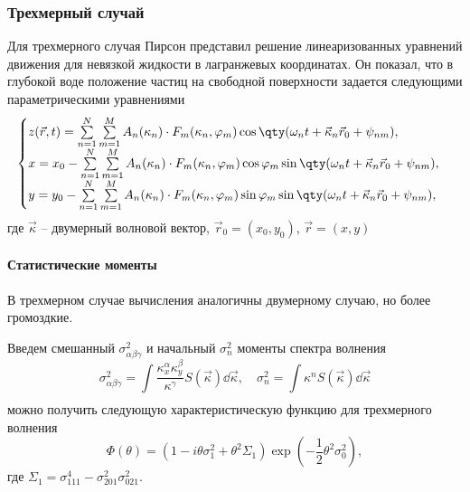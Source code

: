 \subsubsection{Трехмерный случай}%

Для трехмерного случая Пирсон \cite{pierson} представил решение
линеаризованных уравнений движения для невязкой жидкости в лагранжевых
координатах. Он показал, что в глубокой воде положение частиц на свободной поверхности задается следующими параметрическими уравнениями
\begin{equation}
    \begin{cases}
        \label{eq:surface2dcwm}
        z(\vec r,t) = \sum\limits_{n=1}^{N} \sum\limits_{m=1}^{M}
        A_n(\kappa_n) \cdot
        F_m(\kappa_n,\phi_m) \cos \qty(\omega_n t + \vec \kappa_n \vec r_0 +
        \psi_{nm}),    \\
        x = x_0 - \sum\limits_{n=1}^{N} \sum\limits_{m=1}^{M}
        A_n(\kappa_n) \cdot
        F_m(\kappa_n,\phi_m) \cos\phi_m \sin\qty(\omega_n t + \vec \kappa_n \vec r_0 +
        \psi_{nm}),\\
        y = y_{0} - \sum\limits_{n=1}^{N} \sum\limits_{m=1}^{M}
        A_n(\kappa_n) \cdot
        F_m(\kappa_n,\phi_m) \sin \phi_m \sin \qty(\omega_n t + \vec \kappa_n \vec
        r_0 + \psi_{nm}),
    \end{cases}
\end{equation}
где $\vec \kappa$ -- двумерный волновой вектор,  
$\vec r_0 = (x_0, y_0)$, $\vec r = (x, y)$


\paragraph{Статистические моменты}
\label{par:statisticheskie_momenty}
В трехмерном случае вычисления аналогичны двумерному случаю, но более
громоздкие.  

Введем смешанный $\sigma_{\alpha \beta \gamma}^2$ и начальный $\sigma_n^2$ моменты спектра волнения
\begin{equation}
    \sigma^2_{\alpha \beta \gamma} =  \int\limits_{} \frac{\kappa_x^\alpha
    \kappa_y^\beta}{\kappa^{\gamma}} S(\vec \kappa) \dd \vec \kappa,\quad
    \sigma_n^2 = \int\limits_{}^{} \kappa^n S(\vec \kappa) \dd \vec \kappa 
\end{equation}
можно получить следующую характеристическую функцию для трехмерного волнения
\begin{equation}
    \label{eq:char}
    \Phi(\theta) = (1 - i \theta \sigma_1^2 + \theta^2 \Sigma_1)
    \exp(-\frac{1}{2} \theta^2 \sigma_0^2),
\end{equation}
где $\Sigma_1 = \sigma^4_{111} - \sigma_{201}^2 \sigma_{021}^2$.

